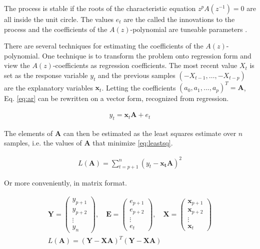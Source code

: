 The process is stable if the roots of the characteristic equation $z^p A(z^{-1}) = 0$ are all inside the unit circle. The values $e_t$ are the called the innovations to the process and the coefficients of the $A(z)$-polynomial are tuneable parameters \citep{lindgren2014stationary}. 

There are several techniques for estimating the coefficients of the $A(z)$-polynomial. One technique is to transform the problem onto regression form and view the $A(z)$-coefficients as regression coefficients. The most recent value $X_t$ is set as the response variable $y_t$ and the previous samples $(-X_{t-1},\dots,-X_{t-p})$ are the explanatory variables $\mathbf{x}_t$. Letting the coefficients $(a_0, a_1,...,a_p)^T = \mathbf{A}$, Eq. \ref{eq:ar} can be rewritten on a vector form, recognized from regression. 

\begin{align}
    y_t = \mathbf{x}_t \mathbf{A} + e_t
\end{align}

The elements of $\mathbf{A}$ can then be estimated as the least squares estimate over $n$ samples, i.e. the values of $\mathbf{A}$ that minimize \ref{eq:leastsq}. 

\begin{align}
    L(\mathbf{A}) = \sum_{t=p+1}^n (y_t - \mathbf{x_t} \mathbf{A})^2 \label{eq:leastsq}
\end{align}

Or more conveniently, in matrix format. 

\begin{align}
    \mathbf{Y} = \begin{pmatrix}
    y_{p+1} \\
    y_{p+2} \\
    \vdots \\
    y_n
    \end{pmatrix} , \hspace{1em} \mathbf{E} = \begin{pmatrix}
    e_{p+1} \\
    e_{p+2} \\
    \vdots \\
    e_t
    \end{pmatrix} , \hspace{1em} \mathbf{X} = \begin{pmatrix}
    \mathbf{x}_{p+1} \\
    \mathbf{x}_{p+2} \\
    \vdots \\
    \mathbf{x}_{t}
    \end{pmatrix} \\[10pt] 
    L(\mathbf{A}) = (\mathbf{Y} - \mathbf{X}\mathbf{A})^T(\mathbf{Y} - \mathbf{X}\mathbf{A})
    \label{eq:leastsqmat}
\end{align}

